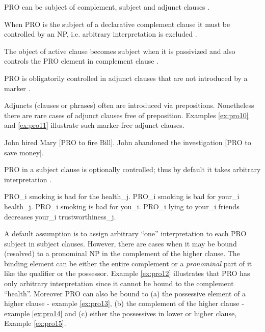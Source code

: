 \begin{generalization}\label{gen:5}
	PRO can be subject of complement, subject and adjunct clauses \citep[278]{Haegeman1991}.
\end{generalization}
\begin{generalization}\label{gen:6}
	When PRO is the subject of a declarative complement clause it must be controlled by an NP, i.e. arbitrary interpretation is excluded \citep[280]{Haegeman1991}.
\end{generalization}
\begin{generalization}\label{gen:7}
	The object of active clause becomes subject when it is passivized and also controls the PRO element in complement clause \citep[281]{Haegeman1991}.
\end{generalization}
\begin{generalization}\label{gen:8}
	PRO is obligatorily controlled in adjunct clauses that are not introduced by a marker \citep[283]{Haegeman1991}.
\end{generalization}

Adjuncts (clauses or phrases) often are introduced via prepositions. Nonetheless there are rare cases of adjunct clauses free of preposition. Examples \ref{ex:pro10} and \ref{ex:pro11} illustrate such marker-free adjunct clauses.

\begin{exe}
	\ex\label{ex:pro10} John hired Mary [PRO to fire Bill].
	\ex\label{ex:pro11} John abandoned the investigation [PRO to save money].
\end{exe}

\begin{generalization}\label{gen:9}
	PRO in a subject clause is optionally controlled; thus by default it takes arbitrary interpretation \citep[283]{Haegeman1991}.  
\end{generalization}

\begin{exe}
    \ex\label{ex:pro12} PRO_i smoking is bad for the health_j.
    \ex\label{ex:pro13} PRO_i smoking is bad for your_i health_j.
    \ex\label{ex:pro14} PRO_i smoking is bad for you_i.
    \ex\label{ex:pro15} PRO_i lying to your_i friends decreases your_i trustworthiness_j.
\end{exe}

A default assumption is to assign arbitrary ``one'' interpretation to each PRO subject in subject clauses. However, there are cases when it may be bound (resolved) to a pronominal NP in the complement of the higher clause. The binding element can be either the entire complement or a \textit{pronominal} part of it like the qualifier or the possessor. Example \ref{ex:pro12} illustrates that PRO has only arbitrary interpretation since it cannot be bound to the complement ``health''. 
Moreover PRO can also be bound to (a) the possessive element of a higher clause - example \ref{ex:pro13}, (b) the complement of the higher clause - example \ref{ex:pro14} and (c) either the possessives in lower or higher clause, Example \ref{ex:pro15}.

